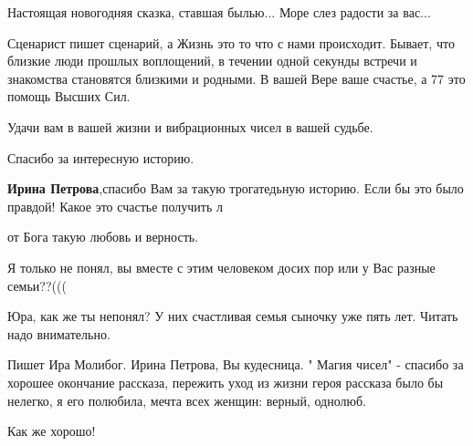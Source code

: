 \begin{itemize}
Настоящая новогодняя сказка, ставшая былью... Море слез радости за вас...


Сценарист пишет сценарий, а Жизнь это то что с нами происходит. Бывает, что
близкие люди прошлых воплощений, в течении одной секунды встречи и знакомства
становятся близкими и родными. В вашей Вере ваше счастье, а 77 это помощь
Высших Сил.

Удачи вам в вашей жизни и вибрационных чисел в вашей судьбе.

Спасибо за интересную историю.

\textbf{Ирина Петрова},спасибо Вам за такую трогатедьную историю. Если бы это было правдой! Какое это счастье получить л

от Бога такую любовь и верность.

Я только не понял, вы вместе с этим человеком досих пор или у Вас разные семьи??(((

Юра, как же ты непонял? У них счастливая семья сыночку уже пять лет. Читать надо внимательно.


Пишет Ира Молибог. Ирина Петрова, Вы кудесница. " Магия чисел" - спасибо за
хорошее окончание рассказа, пережить уход из жизни героя рассказа было бы
нелегко, я его полюбила, мечта всех женщин: верный, однолюб.

Как же хорошо!


\end{itemize} %
